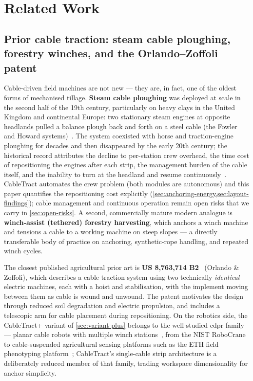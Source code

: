 \documentclass[11pt,a4paper]{article}
\begin{document}
\section{Related Work}\label{sec:related}

\subsection{Prior cable traction: steam cable ploughing, forestry winches, and the Orlando--Zoffoli patent}\label{sec:related-cable}

Cable-driven field machines are not new --- they are, in fact, one of the oldest forms of mechanised tillage. \textbf{Steam cable ploughing} was deployed at scale in the second half of the 19th century, particularly on heavy clays in the United Kingdom and continental Europe: two stationary steam engines at opposite headlands pulled a balance plough back and forth on a steel cable (the Fowler and Howard systems)~\cite{tyler1970steam,lane1980fowler}. The system coexisted with horse and traction-engine ploughing for decades and then disappeared by the early 20th century; the historical record attributes the decline to per-station crew overhead, the time cost of repositioning the engines after each strip, the management burden of the cable itself, and the inability to turn at the headland and resume continuously~\cite{tyler1970steam}. CableTract automates the crew problem (both modules are autonomous) and this paper quantifies the repositioning cost explicitly (\cref{sec:anchoring-energy,sec:layout-findings}); cable management and continuous operation remain open risks that we carry in \cref{sec:open-risks}. A second, commercially mature modern analogue is \textbf{winch-assist (tethered) forestry harvesting}, which anchors a winch machine and tensions a cable to a working machine on steep slopes --- a directly transferable body of practice on anchoring, synthetic-rope handling, and repeated winch cycles.

The closest published agricultural prior art is \textbf{US 8,763,714 B2}~\cite{orlando2014patent} (Orlando \& Zoffoli), which describes a cable traction system using two technically \emph{identical} electric machines, each with a hoist and stabilisation, with the implement moving between them as cable is wound and unwound. The patent motivates the design through reduced soil degradation and electric propulsion, and includes a telescopic arm for cable placement during repositioning. On the robotics side, the CableTract+ variant of \cref{sec:variant-plus} belongs to the well-studied \gls{cdpr} family --- planar cable robots with multiple winch stations~\cite{pott2018cdpr}, from the NIST RoboCrane~\cite{albus1993robocrane} to cable-suspended agricultural sensing platforms such as the ETH field phenotyping platform~\cite{kirchgessner2017fip}; CableTract's single-cable strip architecture is a deliberately reduced member of that family, trading workspace dimensionality for anchor simplicity.
\end{document}
